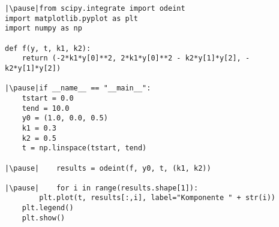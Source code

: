 \begin{frame}[fragile]
    \begin{verbatim}
|\pause|from scipy.integrate import odeint
import matplotlib.pyplot as plt
import numpy as np

def f(y, t, k1, k2):
    return (-2*k1*y[0]**2, 2*k1*y[0]**2 - k2*y[1]*y[2], - k2*y[1]*y[2])

|\pause|if __name__ == "__main__":
    tstart = 0.0
    tend = 10.0
    y0 = (1.0, 0.0, 0.5)
    k1 = 0.3
    k2 = 0.5
    t = np.linspace(tstart, tend)
    
|\pause|    results = odeint(f, y0, t, (k1, k2))

|\pause|    for i in range(results.shape[1]):
        plt.plot(t, results[:,i], label="Komponente " + str(i))
    plt.legend()
    plt.show()
    \end{verbatim}

\end{frame}